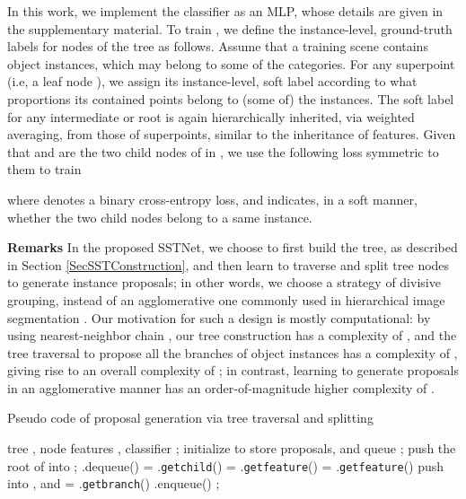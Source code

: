 \documentclass[10pt,twocolumn,letterpaper]{article}
\begin{document}
In this work, we implement the classifier  as an MLP, whose details are given in the supplementary material. To train , we define the instance-level, ground-truth labels for nodes of the tree as follows. Assume that a training scene  contains  object instances, which may belong to some of the  categories. For any superpoint  (i.e, a leaf node ), we assign its instance-level, soft label  according to what proportions its contained points belong to (some of) the  instances. The soft label  for any intermediate or root  is again hierarchically inherited, via weighted averaging, from those of superpoints, similar to the inheritance of features. Given that  and  are the two child nodes of  in , we use the following loss symmetric to them to train 
\vspace{-0.2cm}


where  denotes a binary cross-entropy loss, and  indicates, in a soft manner, whether the two child nodes belong to a same instance.

\noindent\textbf{Remarks} In the proposed SSTNet, we choose to first build the tree, as described in Section \ref{SecSSTConstruction}, and then learn to traverse and split tree nodes to generate instance proposals; in other words, we choose a strategy of divisive grouping, instead of an agglomerative one commonly used in hierarchical image segmentation \cite{2019Hierarchical, Ren_2013_CVPR, guimaraes2012hierarchical}. Our motivation for such a design is mostly computational: by using nearest-neighbor chain \cite{mullner2011modern}, our tree construction has a complexity of , and the tree traversal to propose all the branches of object instances has a complexity of , giving rise to an overall complexity of ; in contrast, learning to generate proposals in an agglomerative manner has an order-of-magnitude higher complexity of .

\renewcommand{\algorithmicrequire}{ \textbf{Input: }} \renewcommand{\algorithmicensure}{ \textbf{Output:}} \begin{algorithm}[htb]
   \caption{Pseudo code of proposal generation via tree traversal and splitting}
   \label{algTraversalProposalsGeneration}
   \begin{algorithmic}[1]
     \Require tree , node features , classifier ;
     \State initialize  to store proposals, and queue ;
     \State push the root of  into ;
         \State .dequeue()
             \State  = .\texttt{getchild}() 
             \State  = .\texttt{getfeature}()
             \State  = .\texttt{getfeature}()
             \If{}
                 \State push  into , and  = .\texttt{getbranch}()
             \Else
                 \State .enqueue()
             \EndIf
         \EndIf
     \EndWhile
     \State \Return ;
   \end{algorithmic}
 \end{algorithm}
\end{document}
